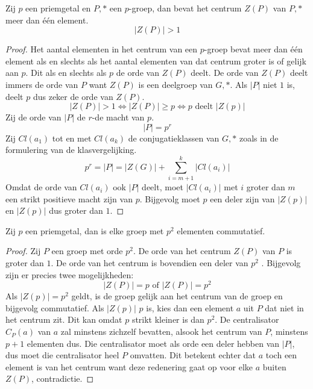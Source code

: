\documentclass[main.tex]{subfiles}
\begin{document}
\begin{pr}
  \label{pr:orde-centrum-pgroep-groter-dan-een}
  Zij $p$ een priemgetal en $P,*$ een $p$-groep, dan bevat het centrum $Z(P)$ van $P,*$ meer dan \'e\'en element.
  \[ |Z(P)| > 1 \]
  
  \begin{proof}
    Het aantal elementen in het centrum van een $p$-groep bevat meer dan \'e\'en element als en slechts als het aantal elementen van dat centrum groter is of gelijk aan $p$.
    Dit als en slechts als $p$ de orde van $Z(P)$ deelt.
    De orde van $Z(P)$ deelt immers de orde van $P$ want $Z(P)$ is een deelgroep van $G,*$. 
    Als $|P|$ niet $1$ is, deelt $p$ dus zeker de orde van $Z(P)$.
    \[ |Z(P)| > 1 \Leftrightarrow |Z(P)| \ge p \Leftrightarrow p \text{ deelt } |Z(p)| \]
    Zij de orde van $|P|$ de $r$-de macht van $p$.
    \[ |P| = p^{r} \]
    Zij $Cl(a_{1})$ tot en met $Cl(a_{k})$ de conjugatieklassen van $G,*$ zoals in de formulering van de klasvergelijking.
    \[ p^{r} = |P| = |Z(G)| + \sum_{i=m+1}^{k}|Cl(a_{i})| \]
    Omdat de orde van $Cl(a_{i})$ ook $|P|$ deelt, moet $|Cl(a_{i})|$ met $i$ groter dan $m$ een strikt positieve macht zijn van $p$.
    Bijgevolg moet $p$ een deler zijn van $|Z(p)|$  en $|Z(p)|$ dus groter dan $1$.
  \end{proof}
\end{pr}


\begin{st}
  \label{st:priemgroep-kwadraat-abels}
  Zij $p$ een priemgetal, dan is elke groep met $p^{2}$ elementen commutatief.

  \begin{proof}
    Zij $P$ een groep met orde $p^{2}$.
    De orde van het centrum $Z(P)$ van $P$ is groter dan $1$.
    De orde van het centrum is bovendien een deler van $p^{2}$ .
    Bijgevolg zijn er precies twee mogelijkheden:
    \[ |Z(P)| = p \text { of } |Z(P)| = p^{2} \]
    Als $|Z(p)| = p^{2}$ geldt, is de groep gelijk aan het centrum van de groep en bijgevolg commutatief.
    Als $|Z(p)|$ $p$ is, kies dan een element $a$ uit $P$ dat niet in het centrum zit. Dit kan omdat $p$ strikt kleiner is dan $p^{2}$.
    De centralisator $C_{P}(a)$ van $a$ zal minstens zichzelf bevatten, alsook het centrum van $P$, minstens $p+1$ elementen dus.
    Die centralisator moet als orde een deler hebben van $|P|$,  dus moet die centralisator heel $P$ omvatten.
    Dit betekent echter dat $a$ toch een element is van het centrum want deze redenering gaat op voor elke $a$ buiten $Z(P)$, contradictie. 
  \end{proof}
\end{st}
\end{document}

